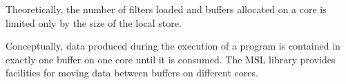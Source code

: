 
Theoretically, the number of filters loaded and buffers allocated on a
core is limited only by the size of the local store.




Conceptually, data produced during the execution of a program is
contained in exactly one buffer on one core until it is consumed. The
MSL library provides facilities for moving data between buffers on
different cores.
 
